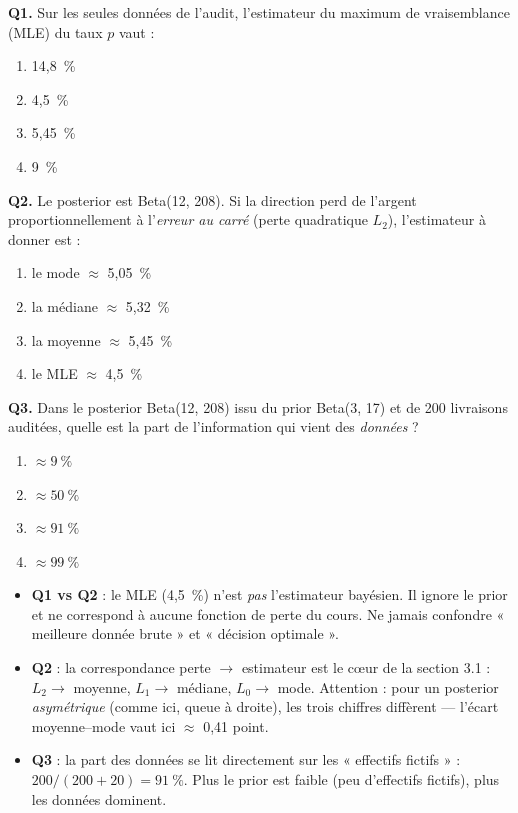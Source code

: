 \documentclass[11pt,a4paper]{article}
\begin{document}
\begin{qcmbox}[Questions 1 à 3]
\textbf{Q1.} Sur les seules données de l'audit, l'estimateur du maximum de
vraisemblance (MLE) du taux $p$ vaut :
\begin{enumerate}[label=\Alph*.), leftmargin=8mm, itemsep=0.3mm]
  \item 14,8~\%
  \item 4,5~\%
  \item 5,45~\%
  \item 9~\%
\end{enumerate}

\vspace{2mm}
\textbf{Q2.} Le posterior est Beta(12, 208). Si la direction perd de l'argent
proportionnellement à l'\emph{erreur au carré} (perte quadratique $L_2$),
l'estimateur à donner est :
\begin{enumerate}[label=\Alph*.), leftmargin=8mm, itemsep=0.3mm]
  \item le mode $\approx$ 5,05~\%
  \item la médiane $\approx$ 5,32~\%
  \item la moyenne $\approx$ 5,45~\%
  \item le MLE $\approx$ 4,5~\%
\end{enumerate}

\vspace{2mm}
\textbf{Q3.} Dans le posterior Beta(12, 208) issu du prior Beta(3, 17) et de
200 livraisons auditées, quelle est la part de l'information qui vient
des \emph{données} ?
\begin{enumerate}[label=\Alph*.), leftmargin=8mm, itemsep=0.3mm]
  \item $\approx 9~\%$
  \item $\approx 50~\%$
  \item $\approx 91~\%$
  \item $\approx 99~\%$
\end{enumerate}
\end{qcmbox}

\begin{piege}[Questions 1 à 3]
\begin{itemize}[leftmargin=4mm, itemsep=0.5mm]
  \item \textbf{Q1 vs Q2} : le MLE (4,5~\%) n'est \emph{pas} l'estimateur
        bayésien. Il ignore le prior et ne correspond à aucune fonction de
        perte du cours. Ne jamais confondre « meilleure donnée brute » et
        « décision optimale ».
  \item \textbf{Q2} : la correspondance perte $\to$ estimateur est le cœur de la
        section 3.1 : $L_2 \to$ moyenne, $L_1 \to$ médiane, $L_0 \to$ mode.
        Attention : pour un posterior \emph{asymétrique} (comme ici, queue à
        droite), les trois chiffres diffèrent --- l'écart moyenne--mode vaut
        ici $\approx$ 0,41 point.
  \item \textbf{Q3} : la part des données se lit directement sur les
        « effectifs fictifs » : $200/(200+20) = 91~\%$. Plus le prior est
        faible (peu d'effectifs fictifs), plus les données dominent.
\end{itemize}
\end{piege}
\end{document}
